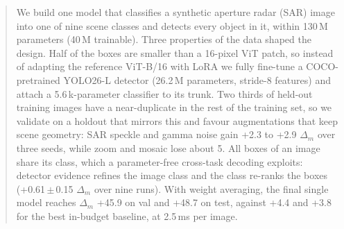 \begin{abstract}
We build one model that classifies a synthetic aperture radar (SAR) image into one of nine scene classes and detects
every object in it, within 130\,M parameters (40\,M trainable).
Three properties of the data shaped the design.
Half of the boxes are smaller than a 16-pixel ViT patch, so instead of adapting the reference ViT-B/16 with LoRA we
fully fine-tune a COCO-pretrained YOLO26-L detector (26.2\,M parameters, stride-8 features) and attach a 5.6\,k-parameter
classifier to its trunk.
Two thirds of held-out training images have a near-duplicate in the rest of the training set, so we validate on a
holdout that mirrors this and favour augmentations that keep scene geometry: SAR speckle and gamma noise gain +2.3 to
+2.9 $\Delta_m$ over three seeds, while zoom and mosaic lose about 5.
All boxes of an image share its class, which a parameter-free cross-task decoding exploits: detector evidence refines
the image class and the class re-ranks the boxes (+0.61\,$\pm$\,0.15 $\Delta_m$ over nine runs).
With weight averaging, the final single model reaches $\Delta_m$ +45.9 on val and +48.7 on test, against +4.4 and +3.8
for the best in-budget baseline, at 2.5\,ms per image.
\end{abstract}
